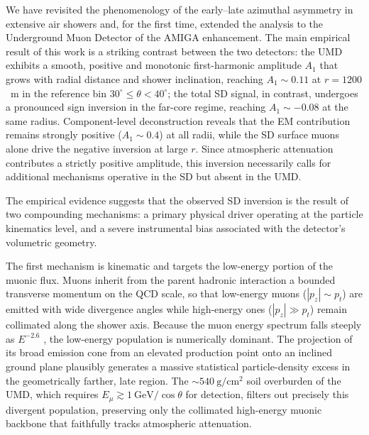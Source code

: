 \documentclass[11pt,a4paper]{article}
\begin{document}
We have revisited the phenomenology of the early--late azimuthal asymmetry in extensive air showers and, for the first time, extended the analysis to the Underground Muon Detector of the AMIGA enhancement. The main empirical result of this work is a striking contrast between the two detectors: the UMD exhibits a smooth, positive and monotonic first-harmonic amplitude $A_1$ that grows with radial distance and shower inclination, reaching $A_1 \sim 0.11$ at $r = 1200$~m in the reference bin $30^\circ \le \theta < 40^\circ$; the total SD signal, in contrast, undergoes a pronounced sign inversion in the far-core regime, reaching $A_1 \sim -0.08$ at the same radius. Component-level deconstruction reveals that the EM contribution remains strongly positive ($A_1 \sim 0.4$) at all radii, while the SD surface muons alone drive the negative inversion at large $r$. Since atmospheric attenuation contributes a strictly positive amplitude, this inversion necessarily calls for additional mechanisms operative in the SD but absent in the UMD.

The empirical evidence suggests that the observed SD inversion is the result of two compounding mechanisms: a primary physical driver operating at the particle kinematics level, and a severe instrumental bias associated with the detector's volumetric geometry.

The first mechanism is kinematic and targets the low-energy portion of the muonic flux. Muons inherit from the parent hadronic interaction a bounded transverse momentum on the QCD scale, so that low-energy muons ($|p_z| \sim p_t$) are emitted with wide divergence angles while high-energy ones ($|p_z| \gg p_t$) remain collimated along the shower axis. Because the muon energy spectrum falls steeply as $E^{-2.6}$ \cite{Cazon2012}, the low-energy population is numerically dominant. The projection of its broad emission cone from an elevated production point onto an inclined ground plane plausibly generates a massive statistical particle-density excess in the geometrically farther, late region. The $\sim 540~\mathrm{g/cm^2}$ soil overburden of the UMD, which requires $E_\mu \gtrsim 1~\mathrm{GeV}/\cos\theta$ for detection, filters out precisely this divergent population, preserving only the collimated high-energy muonic backbone that faithfully tracks atmospheric attenuation. 
\end{document}
